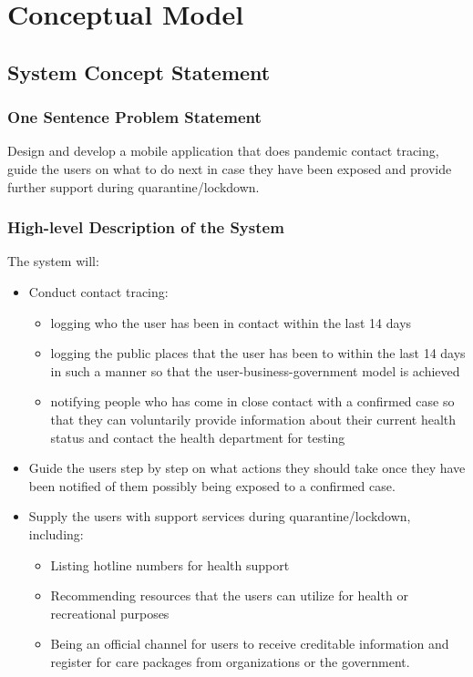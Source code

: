 \section{Conceptual Model}
  \subsection{System Concept Statement}

    \subsubsection{One Sentence Problem Statement}
      \par Design and develop a mobile application that does pandemic contact tracing, guide the users on what to do next in case they have been exposed and provide further support during quarantine/lockdown.

    \subsubsection{High-level Description of the System}
      \par The system will:
      \begin{itemize}
        \item Conduct contact tracing:
        \begin{itemize}
          \item logging who the user has been in contact within the last 14 days
          \item logging the public places that the user has been to within the last 14 days in such a manner so that the user-business-government model is achieved
          \item notifying people who has come in close contact with a confirmed case so that they can voluntarily provide information about their current health status and contact the health department for testing
        \end{itemize}
        \item Guide the users step by step on what actions they should take once they have been notified of them possibly being exposed to a confirmed case.
        \item Supply the users with support services during quarantine/lockdown, including:
          \begin{itemize}
            \item Listing hotline numbers for health support
            \item Recommending resources that the users can utilize for health or recreational purposes
            \item Being an official channel for users to receive creditable information and register for care packages from organizations or the government.
          \end{itemize}
      \end{itemize}

